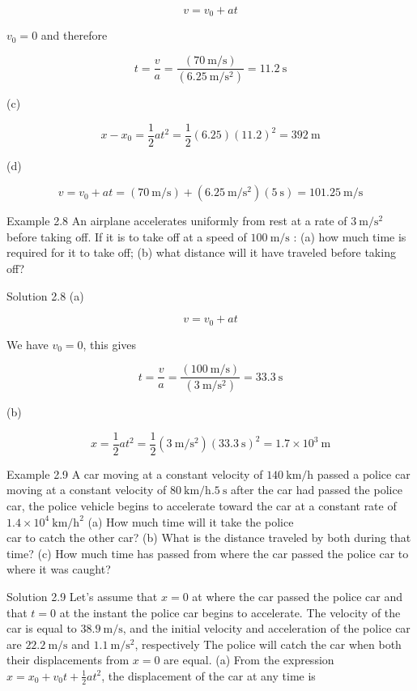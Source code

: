 \documentclass[10pt]{article}
\numberwithin{equation}{section}
\begin{document}
$$
v=v_{0}+a t
$$

$v_{0}=0$ and therefore

$$
t=\frac{v}{a}=\frac{(70 \mathrm{~m} / \mathrm{s})}{\left(6.25 \mathrm{~m} / \mathrm{s}^{2}\right)}=11.2 \mathrm{~s}
$$

(c)

$$
x-x_{0}=\frac{1}{2} a t^{2}=\frac{1}{2}(6.25)(11.2)^{2}=392 \mathrm{~m}
$$

(d)

$$
v=v_{0}+a t=(70 \mathrm{~m} / \mathrm{s})+\left(6.25 \mathrm{~m} / \mathrm{s}^{2}\right)(5 \mathrm{~s})=101.25 \mathrm{~m} / \mathrm{s}
$$

Example 2.8 An airplane accelerates uniformly from rest at a rate of $3 \mathrm{~m} / \mathrm{s}^{2}$ before taking off. If it is to take off at a speed of $100 \mathrm{~m} / \mathrm{s}$ : (a) how much time is required for it to take off; (b) what distance will it have traveled before taking off?

Solution 2.8 (a)

$$
v=v_{0}+a t
$$

We have $v_{0}=0$, this gives

$$
t=\frac{v}{a}=\frac{(100 \mathrm{~m} / \mathrm{s})}{\left(3 \mathrm{~m} / \mathrm{s}^{2}\right)}=33.3 \mathrm{~s}
$$

(b)

$$
x=\frac{1}{2} a t^{2}=\frac{1}{2}\left(3 \mathrm{~m} / \mathrm{s}^{2}\right)(33.3 \mathrm{~s})^{2}=1.7 \times 10^{3} \mathrm{~m}
$$

Example 2.9 A car moving at a constant velocity of $140 \mathrm{~km} / \mathrm{h}$ passed a police car moving at a constant velocity of $80 \mathrm{~km} / \mathrm{h} .5 \mathrm{~s}$ after the car had passed the police car, the police vehicle begins to accelerate toward the car at a constant rate of $1.4 \times 10^{4} \mathrm{~km} / \mathrm{h}^{2}$ (a) How much time will it take the police\\
car to catch the other car? (b) What is the distance traveled by both during that time? (c) How much time has passed from where the car passed the police car to where it was caught?

Solution 2.9 Let's assume that $x=0$ at where the car passed the police car and that $t=0$ at the instant the police car begins to accelerate. The velocity of the car is equal to $38.9 \mathrm{~m} / \mathrm{s}$, and the initial velocity and acceleration of the police car are $22.2 \mathrm{~m} / \mathrm{s}$ and $1.1 \mathrm{~m} / \mathrm{s}^{2}$, respectively The police will catch the car when both their displacements from $x=0$ are equal. (a) From the expression $x=x_{0}+v_{0} t+\frac{1}{2} a t^{2}$, the displacement of the car at any time is
\end{document}
